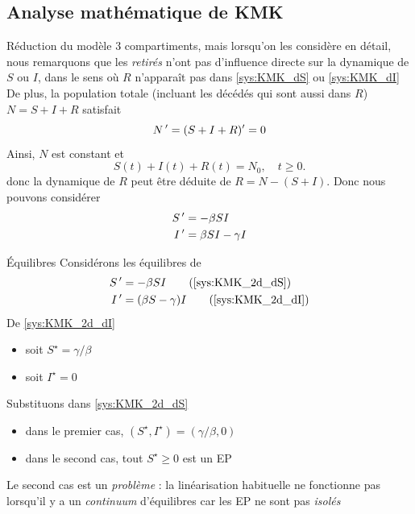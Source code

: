 \documentclass[aspectratio=169]{beamer}\usepackage[]{graphicx}\usepackage[]{xcolor}
\begin{document}
\subsection{Analyse mathématique de KMK}


\begin{frame}{Réduction du modèle}
  3 compartiments, mais lorsqu'on les considère en détail, nous remarquons que les \emph{retirés} n'ont pas d'influence directe sur la dynamique de $S$ ou $I$, dans le sens où $R$ n'apparaît pas dans \eqref{sys:KMK_dS} ou \eqref{sys:KMK_dI}
  \vfill
  De plus, la population totale (incluant les décédés qui sont aussi dans $R$) $N=S+I+R$ satisfait
  \[
  N\,'=(S+I+R)'=0
  \]
  Ainsi, $N$ est constant et 
  \begin{equation}\label{eq:constant_population}
    S(t)+I(t)+R(t)=N_0,\quad t\geq 0.
  \end{equation}
  donc la dynamique de $R$ peut être déduite de $R=N-(S+I)$.
  Donc nous pouvons considérer
  \begin{subequations}\label{sys:KMK_2d}
    \begin{align}
      S\,' &= -\beta SI \label{sys:KMK_2d_dS}\\
      I\,' &= \beta SI-\gamma I  \label{sys:KMK_2d_dI}
      \end{align}
    \end{subequations}
\end{frame}

\begin{frame}{Équilibres}
  Considérons les équilibres de
  \begin{subequations}
    \begin{align}
      S\pprime &= -\beta SI 
      \tag{\ref{sys:KMK_2d_dS}} \\
      I\pprime &= (\beta S-\gamma)I  
      \tag{\ref{sys:KMK_2d_dI}}
    \end{align}
  \end{subequations}
\vfill
  De \eqref{sys:KMK_2d_dI}
  \begin{itemize}
    \item soit $S^\star=\gamma/\beta$ 
    \item soit $I^\star=0$
  \end{itemize}
  \vfill
  Substituons dans \eqref{sys:KMK_2d_dS}
  \begin{itemize}
    \item dans le premier cas, $(S^\star,I^\star)=(\gamma/\beta,0)$ 
    \item dans le second cas, tout $S^\star\geq 0$ est un EP
  \end{itemize}
  \vfill
  Le second cas est un \emph{problème} : la linéarisation habituelle ne fonctionne pas lorsqu'il y a un \emph{continuum} d'équilibres car les EP ne sont pas \emph{isolés}
\end{frame}
\end{document}
